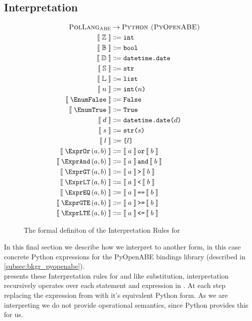 \subsection{Interpretation}
\label{subsec:interpretation}

\begin{figure}[ht]
  \centering
\begin{align*}
  \textsc{\thePolicyLang}&\rightarrow\textsc{Python (PyOpenABE)}\\
  \interpB{\TyInt}&\Coloneqq\text{\ttfamily int}\\
  \interpB{\mathbb{B}}&\Coloneqq\text{\ttfamily bool}\\
  \interpB{\mathbb{D}}&\Coloneqq\text{\ttfamily datetime.date}\\
  \interpB{\mathbb{S}}&\Coloneqq\text{\ttfamily str}\\
  \interpB{\mathbb{L}}&\Coloneqq\text{\ttfamily list}\\
  \interpB{n}&\Coloneqq\text{\ttfamily int(}n\text{\ttfamily)}\\
  \interpB{\EnumFalse}&\Coloneqq\text{\ttfamily False}\\
  \interpB{\EnumTrue} &\Coloneqq\text{\ttfamily True}\\
  \interpB{d}&\Coloneqq\text{\ttfamily datetime.date(}d\text{\ttfamily)}\\
  \interpB{s}&\Coloneqq\text{\ttfamily str(}s\text{\ttfamily)}\\
  \interpB{l}&\Coloneqq\text{\ttfamily [}l\text{\ttfamily]}\\
  \interpB{\exprOr{a}{b}}  &\Coloneqq\interpB{a}\,\text{\ttfamily or}\,\interpB{b}\\
  \interpB{\exprAnd{a}{b}} &\Coloneqq\interpB{a}\,\text{\ttfamily and}\,\interpB{b}\\
  \interpB{\exprGT{a}{b}}  &\Coloneqq\interpB{a}\,\text{\ttfamily \textgreater}\,\interpB{b}\\
  \interpB{\exprLT{a}{b}}  &\Coloneqq\interpB{a}\,\text{\ttfamily \textless}\,\interpB{b}\\
  \interpB{\exprEQ{a}{b}}  &\Coloneqq\interpB{a}\,\text{\ttfamily ==}\,\interpB{b}\\
  \interpB{\exprGTE{a}{b}}  &\Coloneqq\interpB{a}\,\text{\ttfamily \textgreater =}\,\interpB{b}\\
  \interpB{\exprLTE{a}{b}}  &\Coloneqq\interpB{a}\,\text{\ttfamily \textless =}\,\interpB{b}
\end{align*}
  \caption{\label{fig:interp}The formal definiton of the Interpretation Rules for \thePolicyLang}
\end{figure}

In this final section we describe how we interpret \thePolicyLang to another form, in this case concrete Python expressions for the PyOpenABE bindings library (described in \cref{subsec:bkgr_pyopenabe}).\\
 presents these Interpretation rules for \thePolicyLang and like substitution, interpretation recursively operates over each statement and expression in \thePolicyLang. At each step replacing the expression from \thePolicyLang with it's equivalent Python form. As we are interpreting \thePolicyLang we do not provide operational semantics, since Python provides this for us.
